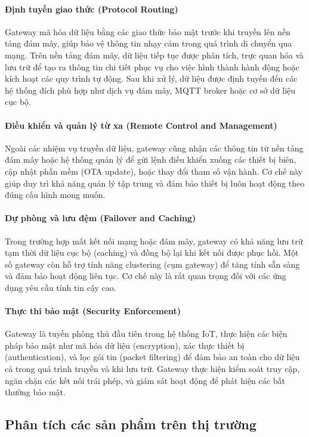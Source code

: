                 \paragraph{Định tuyến giao thức (Protocol Routing)}
                    Gateway mã hóa dữ liệu bằng các giao thức bảo mật trước khi truyền lên nền tảng đám mây, giúp bảo vệ thông tin nhạy cảm trong quá trình di chuyển qua mạng. Trên nền tảng đám mây, dữ liệu tiếp tục được phân tích, trực quan hóa và lưu trữ để tạo ra thông tin chi tiết phục vụ cho việc hình thành hành động hoặc kích hoạt các quy trình tự động. Sau khi xử lý, dữ liệu được định tuyến đến các hệ thống đích phù hợp như dịch vụ đám mây, MQTT broker hoặc cơ sở dữ liệu cục bộ. 
                \paragraph{Điều khiển và quản lý từ xa (Remote Control and Management)}
                    Ngoài các nhiệm vụ truyền dữ liệu, gateway cũng nhận các thông tin từ nền tảng đám mây hoặc hệ thống quản lý để gửi lệnh điều khiển xuống các thiết bị biên, cập nhật phần mềm (OTA update), hoặc thay đổi tham số vận hành. Cơ chế này giúp duy trì khả năng quản lý tập trung và đảm bảo thiết bị luôn hoạt động theo đúng cấu hình mong muốn.
                \paragraph{Dự phòng và lưu đệm (Failover and Caching)}
                    Trong trường hợp mất kết nối mạng hoặc đám mây, gateway có khả năng lưu trữ tạm thời dữ liệu cục bộ (caching) và đồng bộ lại khi kết nối được phục hồi. Một số gateway còn hỗ trợ tính năng clustering (cụm gateway) để tăng tính sẵn sàng và đảm bảo hoạt động liên tục. Cơ chế này là rất quan trọng đối với các ứng dụng yêu cầu tính tin cậy cao.
                \paragraph{Thực thi bảo mật (Security Enforcement)}
                    Gateway là tuyến phòng thủ đầu tiên trong hệ thống IoT, thực hiện các biện pháp bảo mật như mã hóa dữ liệu (encryption), xác thực thiết bị (authentication), và lọc gói tin (packet filtering) để đảm bảo an toàn cho dữ liệu cả trong quá trình truyền và khi lưu trữ. Gateway thực hiện kiểm soát truy cập, ngăn chặn các kết nối trái phép, và giám sát hoạt động để phát hiện các bất thường bảo mật.
    \subsection{Phân tích các sản phẩm trên thị trường}
